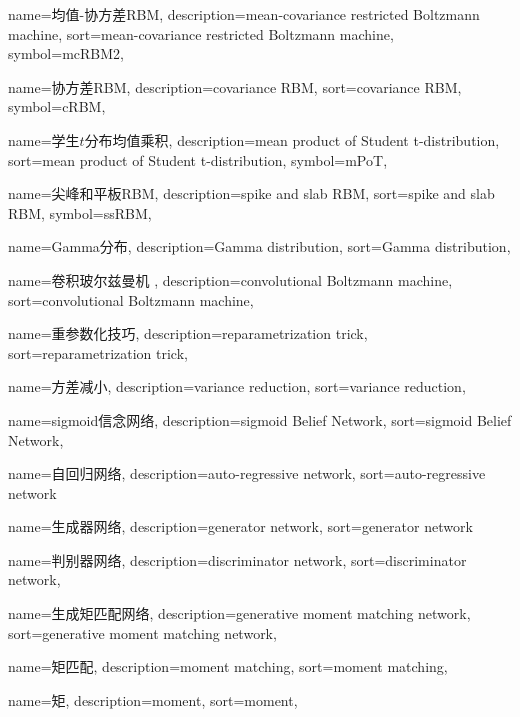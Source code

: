 {
  name=均值-协方差RBM,
  description={mean-covariance restricted Boltzmann machine},
  sort={mean-covariance restricted Boltzmann machine},
  symbol={mcRBM2},
}

{
  name=协方差RBM,
  description={covariance RBM},
  sort={covariance RBM},
  symbol={cRBM},
}

{
  name=学生$t$分布均值乘积,
  description={mean product of Student t-distribution},
  sort={mean product of Student t-distribution},
  symbol={mPoT},
}

{
  name=尖峰和平板RBM,
  description={spike and slab RBM},
  sort={spike and slab RBM},
  symbol={ssRBM},
}

{
  name=Gamma分布,
  description={Gamma distribution},
  sort={Gamma distribution},
}

{
  name=卷积玻尔兹曼机 ,
  description={convolutional Boltzmann machine},
  sort={convolutional Boltzmann machine},
}

{
  name=重参数化技巧,
  description={reparametrization trick},
  sort={reparametrization trick},
}

{
  name=方差减小,
  description={variance reduction},
  sort={variance reduction},
}

{
  name=sigmoid信念网络,
  description={sigmoid Belief Network},
  sort={sigmoid Belief Network},
}

{
  name=自回归网络,
  description={auto-regressive network},
  sort={auto-regressive network}
}

{
  name=生成器网络,
  description={generator network},
  sort={generator network}
}

{
  name=判别器网络,
  description={discriminator network},
  sort={discriminator network},
}

{
  name=生成矩匹配网络,
  description={generative moment matching network},
  sort={generative moment matching network},
}

{
  name=矩匹配,
  description={moment matching},
  sort={moment matching},
}

{
  name=矩,
  description={moment},
  sort={moment},
}

